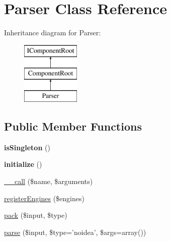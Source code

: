 \hypertarget{class_utopia_1_1_components_1_1_data_parser_1_1_parser}{
\section{Parser Class Reference}
\label{class_utopia_1_1_components_1_1_data_parser_1_1_parser}
}
Inheritance diagram for Parser:\begin{figure}[H]
\begin{center}
\leavevmode
\includegraphics[height=3.000000cm]{class_utopia_1_1_components_1_1_data_parser_1_1_parser}
\end{center}
\end{figure}
\subsection*{Public Member Functions}
\begin{DoxyCompactItemize}
\item 
\hypertarget{class_utopia_1_1_components_1_1_data_parser_1_1_parser_a57299a5aed22b834032064a185623202}{
{\bfseries isSingleton} ()}
\label{class_utopia_1_1_components_1_1_data_parser_1_1_parser_a57299a5aed22b834032064a185623202}

\item 
\hypertarget{class_utopia_1_1_components_1_1_data_parser_1_1_parser_a91098fa7d1917ce4833f284bbef12627}{
{\bfseries initialize} ()}
\label{class_utopia_1_1_components_1_1_data_parser_1_1_parser_a91098fa7d1917ce4833f284bbef12627}

\item 
\hyperlink{class_utopia_1_1_components_1_1_data_parser_1_1_parser_a3815af62ed9d37b2dcaa175379bbfeca}{\_\-\_\-call} (\$name, \$arguments)
\item 
\hyperlink{class_utopia_1_1_components_1_1_data_parser_1_1_parser_a90c4148b0f3405adc7d75a9ab9422984}{registerEngines} (\$engines)
\item 
\hyperlink{class_utopia_1_1_components_1_1_data_parser_1_1_parser_ab8fc6ed896f5ff45ff5721bacb495d7d}{pack} (\$input, \$type)
\item 
\hyperlink{class_utopia_1_1_components_1_1_data_parser_1_1_parser_a88a2e39bf0f99f2fa369ef9bfa364128}{parse} (\$input, \$type='noidea', \$args=array())
\end{DoxyCompactItemize}


